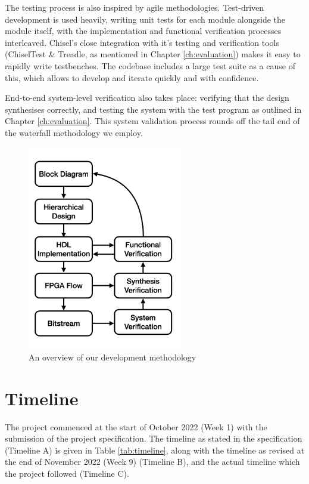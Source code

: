 The testing process is also inspired by agile methodologies. Test-driven development is used heavily, writing unit tests for each module alongside the module itself, with the implementation and functional verification processes interleaved. Chisel's close integration with it's testing and verification tools (ChiselTest \& Treadle, as mentioned in Chapter \ref{ch:evaluation}) makes it easy to rapidly write testbenches. The codebase includes a large test suite as a cause of this, which allows to develop and iterate quickly and with confidence.

End-to-end system-level verification also takes place: verifying that the design synthesises correctly, and testing the system with the test program as outlined in Chapter \ref{ch:evaluation}. This system validation process rounds off the tail end of the waterfall methodology we employ.


\begin{figure}[H]
    \centering
    \includegraphics[width=0.6\textwidth]{../img/methodology.png}
    \caption{An overview of our development methodology}
    \label{fig:methodology}
\end{figure}


\section{Timeline}
The project commenced at the start of October 2022 (Week 1) with the submission of the project specification. The timeline as stated in the specification (Timeline A) is given in Table \ref{tab:timeline}, along with the timeline as revised at the end of November 2022 (Week 9) (Timeline B), and the actual timeline which the project followed (Timeline C).

